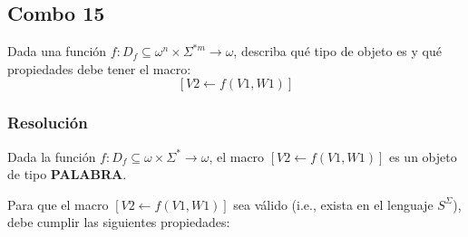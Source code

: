 \documentclass[
]{article}
\begin{document}
\subsection{Combo 15}\label{combo-15}

Dada una función \(f:D_f\subseteq\omega^n\times\Sigma^{*m}\to\omega\),
describa qué tipo de objeto es y qué propiedades debe tener el macro:
\[[V2\leftarrow f(V1,W1)]\]

\subsubsection{Resolución}\label{resoluciuxf3n-14}

Dada la función \(f:D_f\subseteq\omega\times\Sigma^*\to\omega\), el
macro \([V2\leftarrow f(V1,W1)]\) es un objeto de tipo \textbf{PALABRA}.

Para que el macro \([V2\leftarrow f(V1,W1)]\) sea válido (i.e., exista
en el lenguaje \(S^\Sigma\)), debe cumplir las siguientes propiedades:
\end{document}
